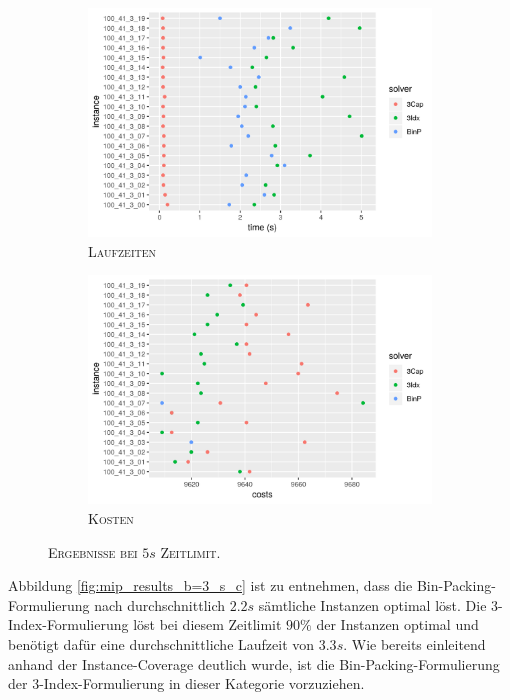 \begin{figure}[H]
\centering
\begin{subfigure}[b]{0.4\textwidth}
\centering
\includegraphics[width=1.3\textwidth]{img/solver_instance_time_b=3_s_5s.png}
\caption{\textsc{Laufzeiten}}
\label{fig:b=3_s_runtimes}
\end{subfigure}
\hfill
\begin{subfigure}[b]{0.4\textwidth}
\centering
\includegraphics[width=1.3\textwidth]{img/solver_instance_cost_b=3_s_5s.png}
\caption{\textsc{Kosten}}
\label{fig:b=3_s_costs}
\end{subfigure}
\caption{\textsc{Ergebnisse bei $5s$ Zeitlimit}.}
\end{figure}

Abbildung \ref{fig:mip_results_b=3_s_c} ist zu entnehmen, dass die Bin-Packing-Formulierung nach durchschnittlich
$2.2s$ sämtliche Instanzen optimal löst. Die 3-Index-Formulierung löst bei diesem Zeitlimit $90 \%$ der Instanzen optimal
und benötigt dafür eine durchschnittliche Laufzeit von $3.3s$. Wie bereits einleitend anhand der Instance-Coverage deutlich wurde, ist die Bin-Packing-Formulierung der 3-Index-Formulierung in dieser Kategorie vorzuziehen.

